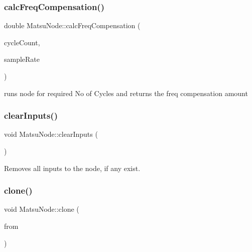 \mbox{\label{classMatsuNode_a19e5a623c7627ab7f7c94dbd71b67554}} 
\subsubsection{\texorpdfstring{calc\+Freq\+Compensation()}{calcFreqCompensation()}}
{\footnotesize\ttfamily double Matsu\+Node\+::calc\+Freq\+Compensation (\begin{DoxyParamCaption}\item[{int}]{cycle\+Count,  }\item[{int}]{sample\+Rate }\end{DoxyParamCaption})}



runs node for required No of Cycles and returns the freq compensation amount 

\mbox{\label{classMatsuNode_a83d81a42f74cadc3f403b65e8b50461e}} 
\subsubsection{\texorpdfstring{clear\+Inputs()}{clearInputs()}}
{\footnotesize\ttfamily void Matsu\+Node\+::clear\+Inputs (\begin{DoxyParamCaption}{ }\end{DoxyParamCaption})}



Removes all inputs to the node, if any exist. 

\mbox{\label{classMatsuNode_a540f3663464549a9dba2c4b41d9930de}} 
\subsubsection{\texorpdfstring{clone()}{clone()}}
{\footnotesize\ttfamily void Matsu\+Node\+::clone (\begin{DoxyParamCaption}\item[{\mbox{\hyperlink{classMatsuNode}{Matsu\+Node}} \&}]{from }\end{DoxyParamCaption})}

